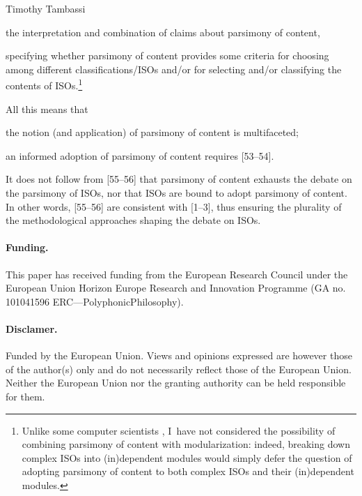 \begin{artengenv}{Timothy Tambassi}
\begin{enumerate}[label={[\arabic*]}]

\setcounter{enumi}{\value{saveenumtambassi}}

\item the interpretation and combination of claims about parsimony of content,

\item specifying whether parsimony of content provides some criteria for choosing among different classifications/ISOs and/or for selecting and/or classifying the contents of ISOs.\footnote{Unlike some computer scientists 
\parencite[][]{floyd_assigning_1967}, %
 I~have not considered the possibility of combining parsimony of content with modularization: indeed, breaking down complex ISOs into (in)dependent modules would simply defer the question of adopting parsimony of content to both complex ISOs and their (in)dependent modules.}



\end{enumerate}

All this means that



\setcounter{saveenumtambassi}{\value{enumi}}

\begin{enumerate}[label={[\arabic*]}]

\setcounter{enumi}{\value{saveenumtambassi}}

\item the notion (and application) of parsimony of content is multifaceted;

\item an informed adoption of parsimony of content requires [53–54].

\end{enumerate}

It does not follow from [55–56] that parsimony of content exhausts the debate on the parsimony of ISOs, nor that ISOs are bound to adopt parsimony of content. In other words, [55–56] are consistent with [1–3], thus ensuring the plurality of the methodological approaches shaping the debate on ISOs.



\paragraph{Funding.} This paper has received funding from the European Research Council under the European Union Horizon Europe Research and Innovation Programme (GA no. 101041596 ERC---PolyphonicPhilosophy).



\paragraph{Disclamer.} Funded by the European Union. Views and opinions expressed are however those of the author(s) only and do not necessarily reflect those of the European Union. Neither the European Union nor the granting authority can be held responsible for them.

\end{artengenv}
